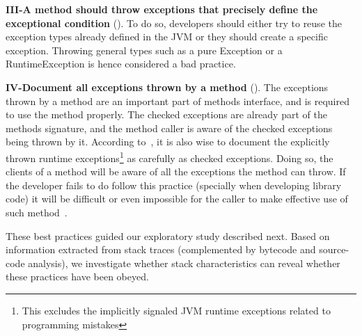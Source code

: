 \documentclass[conference]{IEEEtran}
\begin{document}

\textbf{III-A method should throw exceptions that precisely define the
exceptional condition} (\cite{gosling2000java,bloch2008effective}). To do so,
developers should either try to reuse the exception types already defined in the
JVM or they should create a specific exception. Throwing general types such as a
pure Exception or a RuntimeException is hence considered a bad practice.


\textbf{IV-Document all exceptions thrown by a
method} (\cite{mandrioli1992advances,gosling2000java,wirfs2006toward,bloch2008effective}).
The exceptions thrown by a method are an important part of methods interface,
and is required to use the method properly. The checked exceptions are already
part of the  methods signature, and the method caller is aware of the checked
exceptions being thrown by it. According to~\cite{bloch2008effective}, it is
also wise to document the explicitly thrown runtime exceptions\footnote{This
excludes the implicitly signaled JVM runtime exceptions related to programming
mistakes} as carefully as checked exceptions. Doing so, the clients of a method
will be aware of all the exceptions the method can throw. If the developer fails to
do follow this practice (specially when developing library code) it will be
difficult or even impossible for the caller to make effective use of such 
method~\cite{wirfs2006toward, bloch2008effective}.

These best practices guided our exploratory study described next.
Based on information extracted from stack traces (complemented by
bytecode and source-code analysis), we investigate whether stack characteristics
can reveal whether these practices have been obeyed. 
\end{document}
